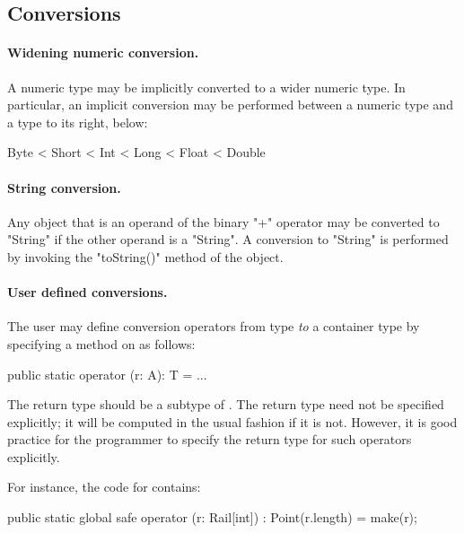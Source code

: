 \subsection{Conversions}

\paragraph{Widening numeric conversion.}
A numeric type may be implicitly converted to a wider numeric type. In
particular, an implicit conversion may be performed between a numeric
type and a type to its right, below:

\begin{xten}
Byte < Short < Int < Long < Float < Double
\end{xten}


\paragraph{String conversion.}
Any object that is an operand of the binary
\xcd"+" operator may
be converted to \xcd"String" if the other operand is a \xcd"String".
A conversion to \xcd"String" is performed by invoking the \xcd"toString()"
method of the object.


\paragraph{User defined conversions.}\label{sec:user-defined-conversions}

The user may define conversion operators from type  {\em to} a
container type  by specifying a method on  as follows:

\begin{xten}
  public static operator (r: A): T = ... 
\end{xten}

The return type  should be a subtype of . The return
type need not be specified explicitly; it will be computed in the
usual fashion if it is not. However, it is good practice for the
programmer to specify the return type for such operators explicitly.

For instance, the code for  contains:

\begin{xten}
  public static global safe operator (r: Rail[int])
     : Point(r.length) = make(r);
\end{xten}

